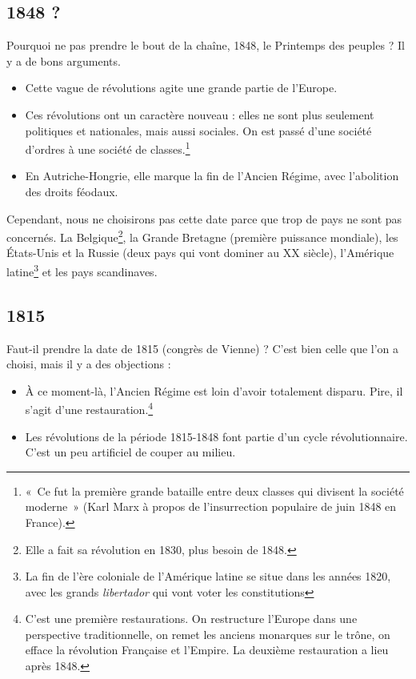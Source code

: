 \documentclass[12pt]{report}
\begin{document}
\subsection*{1848 ?}

Pourquoi ne pas prendre le bout de la chaîne, 1848, le Printemps des peuples ? Il y a de bons arguments.
\begin{itemize}
	\item Cette vague de révolutions agite une grande partie de l'Europe.
	\item Ces révolutions ont un caractère nouveau : elles ne sont plus seulement politiques et nationales, mais aussi sociales. On est passé d'une société d'ordres à une société de classes.\footnote{«~Ce fut la première grande bataille entre deux classes qui divisent la société moderne~» (Karl Marx à propos de l'insurrection populaire de juin 1848 en France).}
	\item En Autriche-Hongrie, elle marque la fin de l'Ancien Régime, avec l'abolition des droits féodaux.
\end{itemize}

Cependant, nous ne choisirons pas cette date parce que trop de pays ne sont pas concernés.
La Belgique\footnote{Elle a fait sa révolution en 1830, plus besoin de 1848.}, la Grande Bretagne (première puissance mondiale), les États-Unis et la Russie (deux pays qui vont dominer au XX siècle), l'Amérique latine\footnote{La fin de l'ère coloniale de l'Amérique latine se situe dans les années 1820, avec les grands \emph{libertador} qui vont voter les constitutions} et les pays scandinaves.


\subsection*{1815}

Faut-il prendre la date de 1815 (congrès de Vienne) ? C'est bien celle que l'on a choisi, mais il y a des objections :
\begin{itemize}
\item À ce moment-là, l'Ancien Régime est loin d'avoir totalement disparu. Pire, il s'agit d'une restauration.\footnote{C'est une première restaurations. On restructure l'Europe dans une perspective traditionnelle, on remet les anciens monarques sur le trône, on efface la révolution Française et l'Empire. La deuxième restauration a lieu après 1848.}
\item Les révolutions de la période 1815-1848 font partie d'un cycle révolutionnaire. C'est un peu artificiel de couper au milieu.
\end{itemize}
\end{document}
